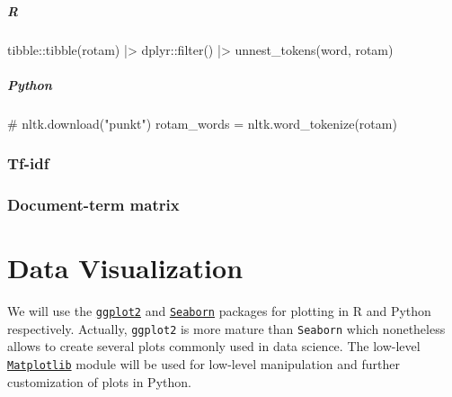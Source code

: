 \documentclass[
  letterpaper,
  DIV=11,
  numbers=noendperiod]{scrreprt}
\newenvironment{Shaded}{\begin{snugshade}}{\end{snugshade}}
\newcommand{\CommentTok}[1]{\textcolor[rgb]{0.37,0.37,0.37}{#1}}
\newcommand{\FunctionTok}[1]{\textcolor[rgb]{0.28,0.35,0.67}{#1}}
\newcommand{\NormalTok}[1]{\textcolor[rgb]{0.00,0.46,0.62}{#1}}
\newcommand{\OperatorTok}[1]{\textcolor[rgb]{0.37,0.37,0.37}{#1}}
\newcommand{\SpecialCharTok}[1]{\textcolor[rgb]{0.37,0.37,0.37}{#1}}
\begin{document}
\hypertarget{r-37}{%
\subsubsection{R}\label{r-37}}

\begin{Shaded}
\begin{Highlighting}[]
\NormalTok{tibble}\SpecialCharTok{::}\FunctionTok{tibble}\NormalTok{(rotam) }\SpecialCharTok{|\textgreater{}} 
\NormalTok{    dplyr}\SpecialCharTok{::}\FunctionTok{filter}\NormalTok{() }\SpecialCharTok{|\textgreater{}} 
    \FunctionTok{unnest\_tokens}\NormalTok{(word, rotam)}
\end{Highlighting}
\end{Shaded}

\hypertarget{python-37}{%
\subsubsection{Python}\label{python-37}}

\begin{Shaded}
\begin{Highlighting}[]
\CommentTok{\# nltk.download("punkt")}
\NormalTok{rotam\_words }\OperatorTok{=}\NormalTok{ nltk.word\_tokenize(rotam)}
\end{Highlighting}
\end{Shaded}

\hypertarget{tf-idf}{%
\section{Tf-idf}\label{tf-idf}}

\hypertarget{document-term-matrix}{%
\section{Document-term matrix}\label{document-term-matrix}}

\part{Data Visualization}

We will use the \href{https://ggplot2.tidyverse.org/}{\texttt{ggplot2}}
and \href{https://seaborn.pydata.org/}{\texttt{Seaborn}} packages for
plotting in R and Python respectively. Actually, \texttt{ggplot2} is
more mature than \texttt{Seaborn} which nonetheless allows to create
several plots commonly used in data science. The low-level
\href{https://matplotlib.org/}{\texttt{Matplotlib}} module will be used
for low-level manipulation and further customization of plots in Python.
\end{document}
